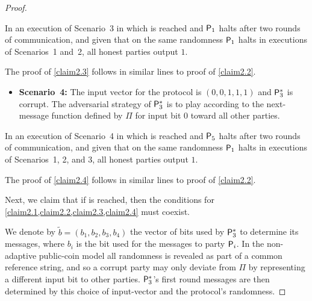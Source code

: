 \begin{proof}
	\begin{claim}\label{claim2.3}
		In an execution of Scenario~3 in which \agr is reached and $\mathsf{P}_1$ halts after two rounds of communication, and given that on the same randomness $\mathsf{P}_1$ halts in executions of Scenarios~1 and~2, all honest parties output $1$.
	\end{claim}
	
	The proof of \cref{claim2.3} follows in similar lines to proof of \cref{claim2.2}.
	
\begin{itemize}
    \item\textbf{Scenario~4:}
	The input vector for the protocol is $(0,0,1,1,1)$ and $\mathsf{P}_3^\ast$ is corrupt. The adversarial strategy of  $\mathsf{P}_3^\ast$ is to play according to the next-message function defined by $\Pi$ for input bit $0$ toward all other parties.
\end{itemize}	
	
	\begin{claim}\label{claim2.4}
		In an execution of Scenario~4 in which \agr is reached and $\mathsf{P}_5$ halts after two rounds of communication, and given that on the same randomness $\mathsf{P}_1$ halts in executions of Scenarios~1, 2, and 3, all honest parties output $1$.
	\end{claim}
	
	The proof of \cref{claim2.4} follows in similar lines to proof of \cref{claim2.2}.
	
	Next, we claim that if \agr is reached, then the conditions for \cref{claim2.1,claim2.2,claim2.3,claim2.4} must coexist.
	
	We denote by $\tilde{b} = (b_1,b_2,b_3,b_4)$ the vector of bits used by $\mathsf{P}_3^\ast$ to determine its messages, where $b_i$ is the bit used for the messages to party $\mathsf{P}_i$. In the non-adaptive public-coin model all randomness is revealed as part of a common reference string, and so a corrupt party may only deviate from $\Pi$ by representing a different input bit to other parties. $\mathsf{P}_3^\ast$'s first round messages are then determined by this choice of input-vector and the protocol's randomness.


\end{proof}
